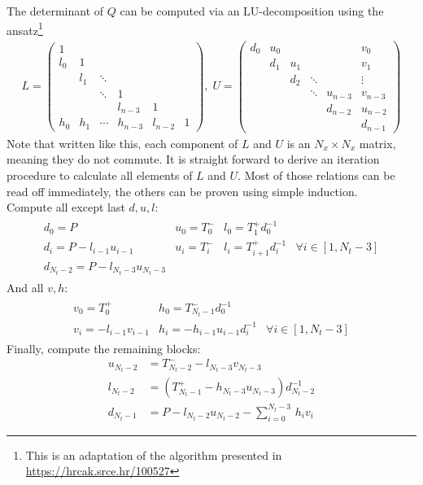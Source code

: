 \documentclass[a4paper, fleqn, twoside, notitlepage]{scrartcl}
\begin{document}
The determinant of $Q$ can be computed via an LU-decomposition using the ansatz\footnote{This is an adaptation of the algorithm presented in \url{https://hrcak.srce.hr/100527}}
\begin{align}
  L =
  \begin{pmatrix}
    1   &     &        &        &        &\\
    l_0 & 1   &        &        &        &\\
        & l_1 & \ddots &        &        &\\
        &     & \ddots & 1      &        &\\
        &     &        & l_{n-3} & 1      & \\
    h_0 & h_1 & \cdots  & h_{n-3} & l_{n-2} & 1
  \end{pmatrix},
  \; U =
  \begin{pmatrix}
    d_0 & u_0 &        &        &        & v_0    \\
        & d_1 & u_1    &        &        & v_1    \\
        &     & d_2    & \ddots &        & \vdots \\
        &     &        & \ddots & u_{n-3} & v_{n-3} \\
        &     &        &        & d_{n-2} & u_{n-2} \\
        &     &        &        &        & d_{n-1}
  \end{pmatrix}
\end{align}
Note that written like this, each component of $L$ and $U$ is an $N_x \times N_x$ matrix, meaning they do not commute.
It is straight forward to derive an iteration procedure to calculate all elements of $L$ and $U$. Most of those relations can be read off immediately, the others can be proven using
simple induction.\\

\noindent
Compute all except last $d, u, l$:
\begin{align}
  \begin{matrix}
    d_0 = P                & u_0 = T^-_0 & l_0 = T^+_1 d_{0}^{-1} & \\
    d_i = P - l_{i-1}u_{i-1} & u_i = T^-_i & l_i = T^+_{i+1} d_{i}^{-1} & \forall i \in [1, N_t-3] \\
    d_{N_t-2} = P - l_{N_t-3} u_{N_t-3} & & &
  \end{matrix}
\end{align}
And all $v, h$:
\begin{align}
  \begin{matrix}
    v_0 = T^+_0           & h_0 = T^-_{N_t-1} d_0^{-1} & \\
    v_i = - l_{i-1} v_{i-1} & h_i = - h_{i-1} u_{i-1} d_{i}^{-1} & \forall i \in [1, N_t-3]
  \end{matrix}
\end{align}
Finally, compute the remaining blocks:
\begin{align}
  u_{N_t-2} &= T^-_{N_t-2} - l_{N_t-3} v_{N_t-3}\\
  l_{N_t-2} &= (T^+_{N_t-1} - h_{N_t-3} u_{N_t-3}) d_{N_t-2}^{-1}\\
  d_{N_t-1} &= P - l_{N_t-2}u_{N_t-2} - \sum_{i=0}^{N_t-3}\, h_i v_i
\end{align}
\end{document}
